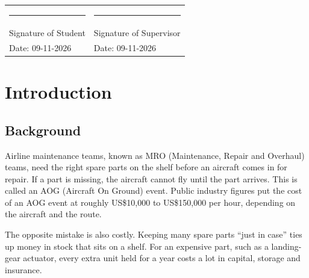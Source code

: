 \documentclass[12pt,oneside]{report}
\newcommand{\gl}[2]{\phantomsection\label{gl:#1}#2}
\begin{document}
\begin{singlespace}
\vspace{2.2em}
\noindent
\begin{tabular*}{\textwidth}{@{\extracolsep{\fill}}ll}
\rule{2.2in}{0.4pt} & \rule{2.2in}{0.4pt}\\
Signature of Student & Signature of Supervisor\\
Date: 09-11-2026 & Date: 09-11-2026\\
\end{tabular*}
\end{singlespace}

\clearpage
\begin{singlespace}
\tableofcontents
\clearpage
{}
\listoffigures
\clearpage
{}
\listoftables
\end{singlespace}

\clearpage
{}
\setcounter{page}{1}

\chapter{Introduction}
\label{ch:intro}

\section{Background}
Airline maintenance teams, known as \gl{mro}{MRO (Maintenance, Repair and Overhaul)} teams, need the right spare parts on the shelf before an aircraft comes in for repair. If a part is missing, the aircraft cannot fly until the part arrives. This is called an \gl{aog}{AOG (Aircraft On Ground)} event. Public industry figures put the cost of an AOG event at roughly US\$10,000 to US\$150,000 per hour, depending on the aircraft and the route.

The opposite mistake is also costly. Keeping many spare parts ``just in case'' ties up money in stock that sits on a shelf. For an expensive part, such as a landing-gear actuator, every extra unit held for a year costs a lot in capital, storage and insurance.
\end{document}
